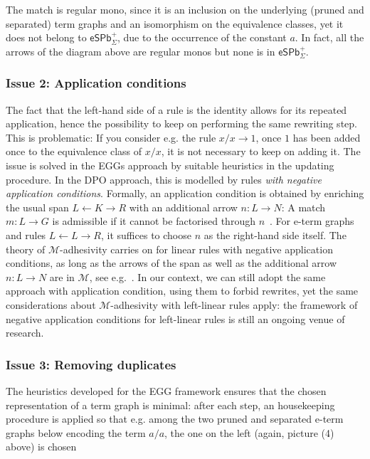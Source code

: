 \documentclass[3p]{elsarticle}
\newcommand{\epbs}{\mathsf{eSPb}^{+}}
\newcommand{\eq}{\mathsf{eq}}
\newcommand{\catname}[1]{\textbf{\textup{#1}}}
\newcommand{\lepsBis}{\mathsf{e}\text{-}\catname{pSep}_{\eq, \Sigma}}
\theoremstyle{remark}
\theoremstyle{definition}
\begin{document}
The match is regular mono, since it is an inclusion on the
underlying (pruned and separated) term graphs and an isomorphism 
on the equivalence classes, yet it does not belong to $\epbs_{\Sigma}$,
due to the occurrence of the constant $a$.
In fact, all the arrows of the diagram above are regular monos but none
is in $\epbs_{\Sigma}$.
%

\subsubsection{Issue 2: Application conditions}
The fact that the left-hand side of a rule is the identity allows for its repeated application, hence the 
possibility to keep on performing the same rewriting step. 
This is problematic: If you consider e.g. the rule $x / x \to 1$, once $1$ has been added once to the equivalence class of 
$x / x$, it is not necessary to keep on adding it.
The issue is solved in the EGGs approach by suitable 
heuristics in the updating procedure. In the DPO approach, this is modelled by rules 
\emph{with negative application conditions}. Formally, an application condition is obtained 
by enriching the usual span 
$L \leftarrow K \rightarrow R$ with an additional arrow $n: L\rightarrow N$: A match $m: L \to G$ is admissible if it cannot
be factorised through $n$~\cite{HabelHT96}. For e-term graphs and rules $L \leftarrow L \rightarrow R$, it suffices to choose $n$ 
as the right-hand side itself.
%
The theory of $\mathcal{M}$-adhesivity carries on for linear rules with negative application conditions, as long as
the arrows of the span as well as the additional arrow $n: L\rightarrow N$ are in $\mathcal{M}$,
see e.g.~\cite{ehrig2014adhesive}.
%
In our context, we can still adopt the same approach with application condition, using them to forbid rewrites, 
yet the same considerations about $\mathcal{M}$-adhesivity with left-linear rules apply:
the framework of negative application conditions for left-linear rules is still an ongoing
venue of research.

\subsubsection{Issue 3: Removing duplicates}
The heuristics developed for the EGG framework ensures that
the chosen representation of a term graph 
is minimal: after each step, an housekeeping procedure 
is applied so that e.g. among the two pruned and separated 
e-term graphs below encoding the term $a/a$,  
the one on the left (again, picture (4) above)
is chosen
\end{document}
